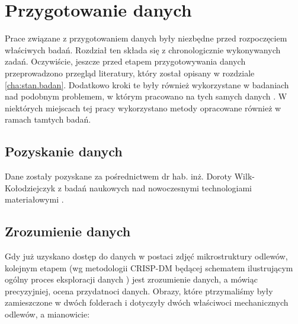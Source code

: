 \chapter{Przygotowanie danych}
\label{cha:przyg.danych}

Prace związane z przygotowaniem danych były niezbędne przed rozpoczęciem właściwych badań. Rozdział ten składa się z chronologicznie wykonywanych zadań. Oczywiście, jeszcze przed etapem przygotowywania danych przeprowadzono przegląd literatury, który został opisany w rozdziale \ref{cha:stan.badan}. Dodatkowo kroki te były również wykorzystane w badaniach nad podobnym problemem, w którym pracowano na tych samych danych \cite{Reczek21}. W niektórych miejscach tej pracy wykorzystano metody opracowane również w ramach tamtych badań.

\section{Pozyskanie danych}
\label{sec:pozyskanie_danych}

Dane zostały pozyskane za pośrednictwem dr hab. inż. Doroty Wilk-Kołodziejczyk z badań naukowych nad nowoczesnymi technologiami materiałowymi \cite{Pirowski17, specodlew}.

\section{Zrozumienie danych}
\label{sec:zrozumienie_danych}

Gdy już uzyskano dostęp do danych w postaci zdjęć mikrostruktury odlewów, kolejnym etapem (wg metodologii CRISP-DM będącej schematem ilustrującym ogólny proces eksploracji danych \cite{Watson00}) jest zrozumienie danych, a mówiąc precyzyjniej, ocena przydatnoci danych. 
Obrazy, które ptrzymaliśmy były zamieszczone w dwóch folderach i dotyczyły dwóch właściwoci mechanicznych odlewów, a mianowicie:

